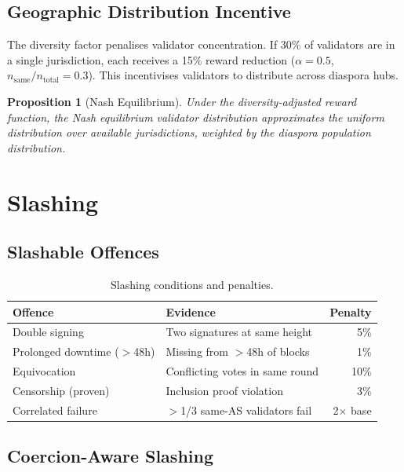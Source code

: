 \documentclass[11pt,a4paper]{article}
\newtheorem{proposition}{Proposition}[section]
\begin{document}
\subsection{Geographic Distribution Incentive}

The diversity factor penalises validator concentration.  If 30\% of
validators are in a single jurisdiction, each receives a 15\% reward
reduction ($\alpha = 0.5$, $n_{\mathrm{same}}/n_{\mathrm{total}} = 0.3$).
This incentivises validators to distribute across diaspora hubs.

\begin{proposition}[Nash Equilibrium]
    Under the diversity-adjusted reward function, the Nash equilibrium
    validator distribution approximates the uniform distribution over
    available jurisdictions, weighted by the diaspora population
    distribution.
\end{proposition}

\section{Slashing}
\label{sec:slashing}

\subsection{Slashable Offences}

\begin{table}[h]
\centering
\caption{Slashing conditions and penalties.}
\label{tab:slashing}
\begin{tabular}{@{}llr@{}}
\toprule
\textbf{Offence} & \textbf{Evidence} & \textbf{Penalty} \\
\midrule
Double signing   & Two signatures at same height & 5\% \\
Prolonged downtime ($>$48h) & Missing from $>$48h of blocks & 1\% \\
Equivocation     & Conflicting votes in same round & 10\% \\
Censorship (proven) & Inclusion proof violation & 3\% \\
Correlated failure & $>$1/3 same-AS validators fail & 2$\times$ base \\
\bottomrule
\end{tabular}
\end{table}

\subsection{Coercion-Aware Slashing}
\end{document}
